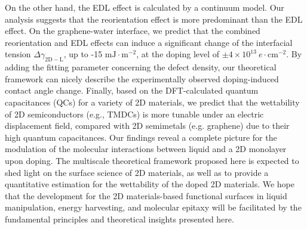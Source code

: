 On the other hand, the EDL effect is calculated by a continuum model. Our
analysis suggests that the reorientation effect is more predominant
than the EDL effect. On the graphene-water interface, we predict that
the combined reorientation and EDL effects can induce a significant
change of the interfacial tension \(\Delta
\gamma_{\mathrm{2D-L}}\), up to -15 \(\mathrm{mJ}\cdot
\mathrm{m}^{-2}\), at the doping level of \(\pm 4 \times 10^{13}\ e\cdot
\mathrm{cm}^{-2}\). By adding the fitting parameter concerning the
defect density, our theoretical framework can nicely describe the
experimentally observed doping-induced contact angle change. Finally,
based on the DFT-calculated quantum capacitances (QCs) for a variety
of 2D materials, we predict that the wettability of 2D semiconductors
(e.g., TMDCs) is more tunable under an electric displacement field,
compared with 2D semimetals (e.g. graphene) due to their high quantum
capacitances. Our findings reveal a complete picture for the
modulation of the molecular interactions between liquid and a 2D monolayer upon
doping. The multiscale theoretical
framework proposed here is expected to shed
light on the surface science of 2D materials, 
as well as to provide a quantitative estimation for the wettability
of the doped 2D materials. We hope that the development for the 2D
materials-based functional surfaces in liquid manipulation, energy
harvesting, and molecular epitaxy will be facilitated by the
fundamental principles and theoretical insights presented here.






% 




